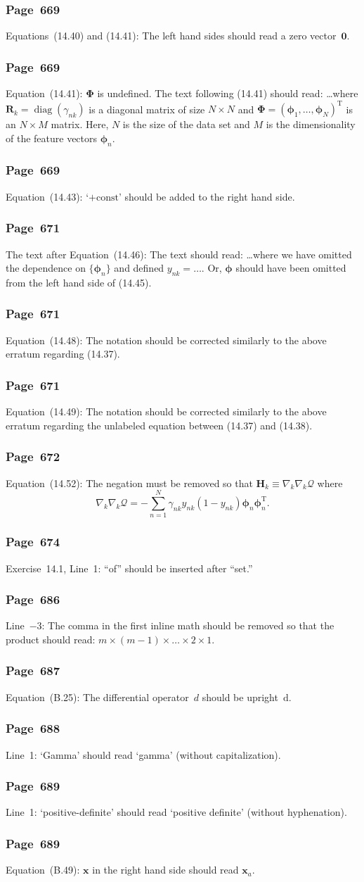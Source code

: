 \documentclass[12pt,a4paper]{article}
\newcommand{\erratum}[1]{\subsubsection*{#1}}
\begin{document}
\erratum{Page~669}
Equations~(14.40) and (14.41): The left hand sides should read a zero vector~$\mathbf{0}$.

\erratum{Page~669}
Equation~(14.41): $\bm{\Phi}$ is undefined.
The text following (14.41) should read:
\dots where $\mathbf{R}_k = \operatorname{diag}(\gamma_{nk})$ is
a diagonal matrix of size $N \times N$ and
$\bm{\Phi} = \left( \bm{\phi}_1, \dots, \bm{\phi}_N \right)^{\operatorname{T}}$ is
an $N \times M$ matrix.
Here, $N$ is the size of the data set and
$M$ is the dimensionality of the feature vectors $\bm{\phi}_n$.

\erratum{Page~669}
Equation~(14.43): `$+\text{const}$' should be added to the right hand side.

\erratum{Page~671}
The text after Equation~(14.46):
The text should read: \dots where we have omitted the dependence on $\{\bm{\phi}_n\}$ and
defined $y_{nk} = \dots$.
Or, $\bm{\phi}$ should have been omitted from the left hand side of (14.45).

\erratum{Page~671}
Equation~(14.48):
The notation should be corrected similarly to the above erratum regarding (14.37).

\erratum{Page~671}
Equation~(14.49):
The notation should be corrected similarly to the above erratum regarding the unlabeled equation
between (14.37) and (14.38).

\erratum{Page~672}
Equation~(14.52):
The negation must be removed so that $\mathbf{H}_k \equiv \nabla_k \nabla_k \mathcal{Q}$ where
\begin{equation}
\nabla_k \nabla_k \mathcal{Q}
   = - \sum_{n=1}^{N} \gamma_{nk} y_{nk} (1 - y_{nk}) \bm{\phi}_n \bm{\phi}_n^{\operatorname{T}}.
\end{equation}

\erratum{Page~674}
Exercise~14.1, Line~1:
``of'' should be inserted after ``set.''

\erratum{Page~686}
Line~$-3$:
The comma in the first inline math should be removed so that the product should read:
$m \times (m-1) \times \dots \times 2 \times 1$.

\erratum{Page~687}
Equation~(B.25):
The differential operator~$d$ should be upright~$\mathrm{d}$.

\erratum{Page~688}
Line~1:
`Gamma' should read `gamma' (without capitalization).

\erratum{Page~689}
Line~1: `positive-definite' should read `positive definite' (without hyphenation).

\erratum{Page~689}
Equation~(B.49):
$\mathbf{x}$ in the right hand side should read $\mathbf{x}_{a}$.
\end{document}
